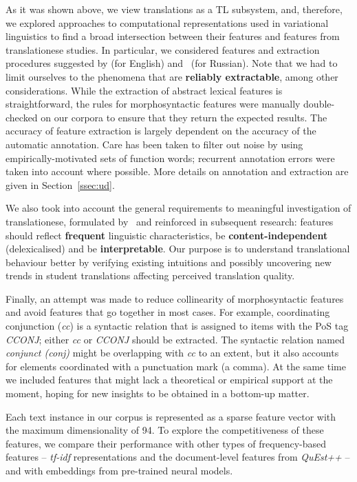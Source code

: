 As it was shown above, we view translations as a TL subsystem, and, therefore, we explored approaches to computational representations used in variational linguistics to find a broad intersection between their features and features from translationese studies. 
In particular, we considered features and extraction procedures suggested by \citet{Biber1995,Nini2015} (for English) and~\citet{Katinskaya2015} (for Russian). Note that we had to limit ourselves to the phenomena that are \textbf{reliably extractable}, among other considerations. While the extraction of abstract lexical features is straightforward, the rules for morphosyntactic features were manually double-checked on our corpora to ensure that they return the expected results. The accuracy of feature extraction is largely dependent on the accuracy of the automatic annotation. Care has been taken to filter out noise by using empirically-motivated sets of function words; recurrent annotation errors were taken into account where possible. More details on annotation and extraction are given in Section~\ref{ssec:ud}.

We also took into account the general requirements to meaningful investigation of translationese, formulated by~\citet{Volansky2015} and reinforced in subsequent research: features should reflect \textbf{frequent} linguistic characteristics, be \textbf{content-independent} (delexicalised) and be \textbf{interpretable}. Our purpose is to understand translational behaviour better by verifying existing intuitions and possibly uncovering new trends in student translations affecting perceived translation quality. 

Finally, an attempt was made to reduce collinearity of morphosyntactic features and avoid features that go together in most cases. For example, coordinating conjunction (\textit{cc}) is a syntactic relation that is assigned to items with the PoS tag \textit{CCONJ}; either \textit{cc} or \textit{CCONJ} should be extracted. The syntactic relation named \textit{conjunct (conj)} might be overlapping with \textit{cc} to an extent, but it also accounts for elements coordinated with a punctuation mark (a comma).
At the same time we included features that might lack a theoretical or empirical support at the moment, hoping for new insights to be obtained in a bottom-up matter.

Each text instance in our corpus is represented as a sparse feature vector with the maximum dimensionality of 94. 
To explore the competitiveness of these features, we compare their performance with other types of frequency-based features -- \textit{tf-idf} representations and the document-level features from \textit{QuEst++} -- and with embeddings from pre-trained neural models.

